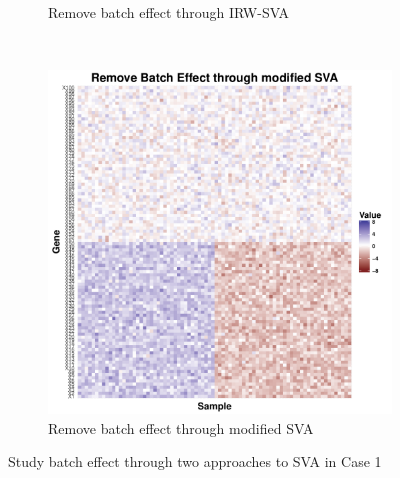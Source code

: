 \documentclass[11pt]{article}
\begin{document}
\begin{figure}[h!]
\begin{subfigure}[b]{0.31\textwidth}
        \caption{Remove batch effect through IRW-SVA}
        \label{fig:sva1}
    \end{subfigure}  %
~
    \begin{subfigure}[b]{0.31\textwidth}
        \centering
        \includegraphics[width = \textwidth]{figures/new_sva1.pdf}
        \caption{Remove batch effect through modified SVA}
        \label{fig:new_sva1}
    \end{subfigure}    
    \caption{Study batch effect through two approaches to SVA in Case 1}
    \label{fig:svas1}
\end{figure}
\end{document}
